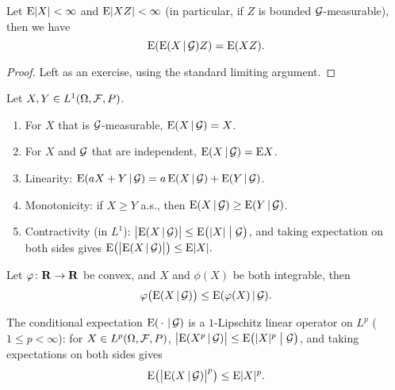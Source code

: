 
\begin{fact} \label{fact:char-property-CE}
    Let $\mathop{}\!\mathrm{E} \lvert X \rvert < \infty$ and $\mathop{}\!\mathrm{E}\lvert X Z \rvert < \infty$ (in particular, if $Z$ is bounded $\mathcal{G}$-measurable), then we have \[
        \mathop{}\!\mathrm{E}(\mathop{}\!\mathrm{E}(X \,|\, \mathcal{G}) Z) = \mathop{}\!\mathrm{E}(X Z).
    \]%
\end{fact}
\begin{proof}
    Left as an exercise, using the standard limiting argument.
\end{proof}

\begin{prop} Let $X,Y \in L^1(\Omega,\mathcal{F},P)$.
    \begin{enumerate}
        \item For $X$ that is $\mathcal{G}$-measurable, $\mathop{}\!\mathrm{E}(X \,|\, \mathcal{G}) = X$.
        \item For $X$ and $\mathcal{G}$ that are independent, $\mathop{}\!\mathrm{E}(X \,|\, \mathcal{G}) = \mathop{}\!\mathrm{E} X$.
        \item Linearity: $\mathop{}\!\mathrm{E}(aX + Y \,|\, \mathcal{G}) = a\mathop{}\!\mathrm{E}(X \,|\, \mathcal{G}) + \mathop{}\!\mathrm{E}(Y\,|\, \mathcal{G})$.
        \item Monotonicity: if $X \geq Y$ a.s., then $\mathop{}\!\mathrm{E}(X \,|\, \mathcal{G}) \geq \mathop{}\!\mathrm{E}(Y \,|\, \mathcal{G})$.
        \item Contractivity (in $L^1$): $\bigl\vert \mathop{}\!\mathrm{E}(X \,|\, \mathcal{G})\bigr\vert \leq \mathop{}\!\mathrm{E}\bigl(\lvert X \rvert \bigm\vert \mathcal{G}\bigr)$, and taking expectation on both sides gives $\mathop{}\!\mathrm{E}\bigl(\bigl\vert\mathop{}\!\mathrm{E}(X \,|\, \mathcal{G})\bigr\vert\bigr) \leq \mathop{}\!\mathrm{E} \lvert X \rvert.$
    \end{enumerate}
\end{prop}

\begin{namedthm} \label{thm:cond-Jensen}
    Let $\varphi\colon \mathbf{R} \to \mathbf{R}$ be convex, and $X$ and $\phi(X)$ be both integrable, then \[
        \varphi\bigl(\mathop{}\!\mathrm{E} (X\,|\, \mathcal{G})\bigr) \leq \mathop{}\!\mathrm{E} (\varphi(X) \,|\, \mathcal{G}).
    \]
\end{namedthm}

\begin{cor} \label{cor:CE-contraction}
    The conditional expectation $\mathop{}\!\mathrm{E}(\,\cdot\, \,|\, \mathcal{G})$ is a $1$-Lipschitz linear operator on $L^p$ ($1 \leq p < \infty$): for $X \in L^p(\Omega,\mathcal{F},P)$, $\bigl\vert \mathop{}\!\mathrm{E}(X^p \,|\, \mathcal{G})\bigr\vert \leq \mathop{}\!\mathrm{E}\bigl(\lvert X \rvert^p \bigm\vert \mathcal{G}\bigr)$, and taking expectations on both sides gives
        \[
            \mathop{}\!\mathrm{E}\bigl(\bigl\vert\mathop{}\!\mathrm{E}(X \,|\, \mathcal{G})\bigr\vert^p\bigr) \leq \mathop{}\!\mathrm{E} \lvert X \rvert^p.
        \]
\end{cor}

